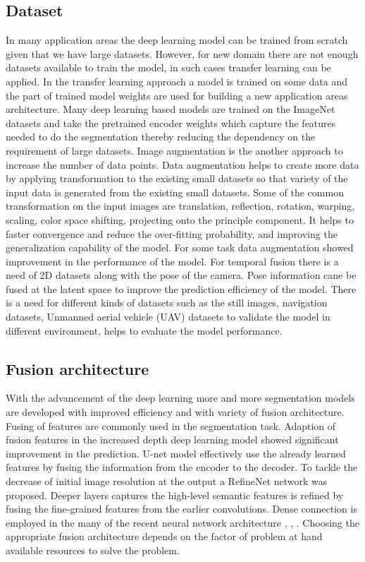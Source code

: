 		
    \subsection{Dataset}
	
	In many application areas the deep learning model can be trained from scratch given that we have large datasets. However, for new domain there are not enough datasets available to train the model, in such cases transfer learning can be applied. In the transfer learning approach a model is trained on some data and the part of trained model weights are used for building a new application areas architecture. Many deep learning based models are trained on the ImageNet datasets and take the pretrained encoder weights which capture the features needed to do the segmentation thereby reducing the dependency on the requirement of large datasets. Image augmentation is the another approach to increase the number of data points. Data augmentation helps to create more data by applying transformation to the existing small datasets so that variety of the input data is generated from the existing small datasets. Some of the common transformation on the input images are translation, reflection, rotation, warping, scaling, color space shifting, projecting onto the principle component. It helps to faster convergence and reduce the over-fitting probability, and improving the generalization capability of the model. For some task data augmentation showed improvement in the performance of the model. For temporal fusion there is a need of 2D datasets along with the pose of the camera. Pose information cane be fused at the latent space to improve the prediction efficiency of the model. There is a need for different kinds of datasets such as the still images, navigation datasets, Unmanned aerial vehicle (UAV) datasets to validate the model in different environment, helps to evaluate the model performance.  

    \subsection{Fusion architecture}
    
    With the advancement of the deep learning more and more segmentation models are developed with improved efficiency and with variety of fusion architecture. Fusing of features are commonly used in the segmentation task. Adaption of fusion features in the increased depth deep learning model showed significant improvement in the prediction. U-net \cite{26_ronneberger2015u} model effectively use the already learned features by fusing the information from the encoder to the decoder. To tackle the decrease of initial image resolution at the output a RefineNet \cite{27_lin2017refinenet} network was proposed. Deeper layers captures the high-level semantic features is refined by fusing the  fine-grained features from the earlier convolutions. Dense connection is employed in the many of the recent neural network architecture \cite{28_jegou2017one}, \cite{29_iandola2014densenet}, \cite{30_yang2018denseaspp}. Choosing the appropriate fusion architecture depends on the factor of problem at hand available resources to solve the problem. 

